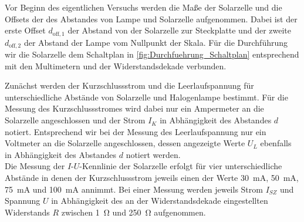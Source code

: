 
Vor Beginn des eigentlichen Versuchs werden die Maße der Solarzelle und die Offsets der 
des Abstandes von Lampe und Solarzelle aufgenommen. Dabei ist der erste Offset $d_{\text{off},1}$
der Abstand von der Solarzelle zur Steckplatte und der zweite $d_{\text{off},2}$ der Abstand der 
Lampe vom Nullpunkt der Skala.
Für die Durchführung wir die Solarzelle dem Schaltplan in \cref{fig:Durchfuehrung_Schaltplan}
entsprechend mit den Multimetern und der Widerstandsdekade verbunden.


Zunächst werden der Kurzschlussstrom und die Leerlaufspannung für unterschiedliche Abstände
von Solarzelle und Halogenlampe bestimmt. Für die Messung des Kurzschlussstromes  
wird dabei nur ein Ampermeter an die Solarzelle angeschlossen und der Strom $I_{K}$ in Abhängigkeit
des Abstandes $d$ notiert.
Entsprechend wir bei der Messung des Leerlaufspannung nur ein Voltmeter an die Solarzelle
angeschlossen, dessen angezeigte Werte $U_{L}$ ebenfalls in Abhängigkeit des Abstandes $d$ notiert werden.\\

Die Messung der $I\text{-}U$-Kennlinie der Solarzelle erfolgt für vier unterschiedliche Abstände in denen 
der Kurzschlussstrom jeweils einen der Werte \SI{30}{\milli\ampere}, \SI{50}{\milli\ampere}, \SI{75}{\milli\ampere} und 
\SI{100}{\milli\ampere} annimmt.
Bei einer Messung werden jeweils Strom $I_{SZ}$ und Spannung $U$ in Abhängigkeit des an der Widerstandsdekade 
eingestellten Widerstands $R$ zwischen \SI{1}{\ohm} und \SI{250}{\ohm} aufgenommen.